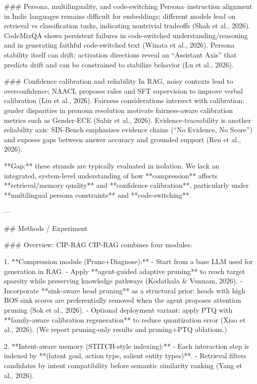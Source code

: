 ### Persona, multilinguality, and code-switching  
Persona–instruction alignment in Indic languages remains difficult for embeddings; different models lead on retrieval vs classification tasks, indicating nontrivial tradeoffs (Shah et al., 2026). CodeMixQA shows persistent failures in code-switched understanding/reasoning and in generating faithful code-switched text (Winata et al., 2026). Persona stability itself can drift; activation directions reveal an “Assistant Axis” that predicts drift and can be constrained to stabilize behavior (Lu et al., 2026).

### Confidence calibration and reliability  
In RAG, noisy contexts lead to overconfidence; NAACL proposes rules and SFT supervision to improve verbal calibration (Liu et al., 2026). Fairness considerations intersect with calibration: gender disparities in pronoun resolution motivate fairness-aware calibration metrics such as Gender-ECE (Sabir et al., 2026). Evidence-traceability is another reliability axis: SIN-Bench emphasizes evidence chains (“No Evidence, No Score”) and exposes gaps between answer accuracy and grounded support (Ren et al., 2026).

**Gap:** these strands are typically evaluated in isolation. We lack an integrated, system-level understanding of how **compression** affects **retrieval/memory quality** and **confidence calibration**, particularly under **multilingual persona constraints** and **code-switching**.

---

## Methods / Experiment  

### Overview: CIP-RAG  
CIP-RAG combines four modules:

1. **Compression module (Prune+Diagnose):**  
   - Start from a base LLM used for generation in RAG.  
   - Apply **agent-guided adaptive pruning** to reach target sparsity while preserving knowledge pathways (Kodathala & Vunnam, 2026).  
   - Incorporate **sink-aware head pruning** as a structural prior: heads with high BOS sink scores are preferentially removed when the agent proposes attention pruning (Sok et al., 2026).  
   - Optional deployment variant: apply PTQ with **family-aware calibration regeneration** to reduce quantization error (Xiao et al., 2026). (We report pruning-only results and pruning+PTQ ablations.)

2. **Intent-aware memory (STITCH-style indexing):**  
   - Each interaction step is indexed by **(latent goal, action type, salient entity types)**.  
   - Retrieval filters candidates by intent compatibility before semantic similarity ranking (Yang et al., 2026).

